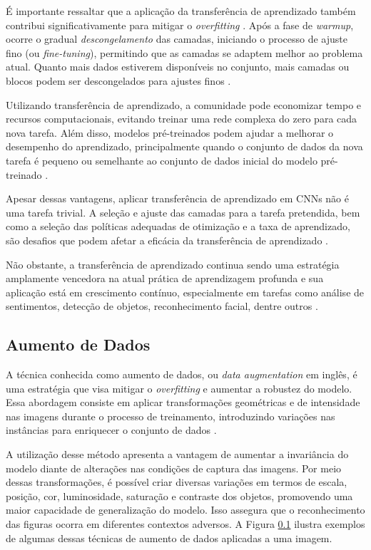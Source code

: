 É importante ressaltar que a aplicação da transferência de aprendizado também contribui significativamente para mitigar o \textit{overfitting} \citep{Geron2017Hands-onSystems}. Após a fase de \textit{warmup}, ocorre o gradual \textit{descongelamento} das camadas, iniciando o processo de ajuste fino (ou \textit{fine-tuning}), permitindo que as camadas se adaptem melhor ao problema atual. Quanto mais dados estiverem disponíveis no conjunto, mais camadas ou blocos podem ser descongelados para ajustes finos \citep{Geron2017Hands-onSystems}.

Utilizando transferência de aprendizado, a comunidade pode economizar tempo e recursos computacionais, evitando treinar uma rede complexa do zero para cada nova tarefa. Além disso, modelos pré-treinados podem ajudar a melhorar o desempenho do aprendizado, principalmente quando o conjunto de dados da nova tarefa é pequeno ou semelhante ao conjunto de dados inicial do modelo pré-treinado \citep{Pan2010}.

Apesar dessas vantagens, aplicar transferência de aprendizado em CNNs não é uma tarefa trivial. A seleção e ajuste das camadas para a tarefa pretendida, bem como a seleção das políticas adequadas de otimização e a taxa de aprendizado, são desafios que podem afetar a eficácia da transferência de aprendizado \citep{Yosinski2014HowNetworks}.

Não obstante, a transferência de aprendizado continua sendo uma estratégia amplamente vencedora na atual prática de aprendizagem profunda e sua aplicação está em crescimento contínuo, especialmente em tarefas como análise de sentimentos, detecção de objetos, reconhecimento facial, dentre outros \citep{Pan2010}.

\subsection{Aumento de Dados}
\label{cnn:augment}

A técnica conhecida como aumento de dados, ou \textit{data augmentation} em inglês, é uma estratégia que visa mitigar o \textit{overfitting} e aumentar a robustez do modelo. Essa abordagem consiste em aplicar transformações geométricas e de intensidade nas imagens durante o processo de treinamento, introduzindo variações nas instâncias para enriquecer o conjunto de dados \citep{Geron2017Hands-onSystems}.

A utilização desse método apresenta a vantagem de aumentar a invariância do modelo diante de alterações nas condições de captura das imagens. Por meio dessas transformações, é possível criar diversas variações em termos de escala, posição, cor, luminosidade, saturação e contraste dos objetos, promovendo uma maior capacidade de generalização do modelo. Isso assegura que o reconhecimento das figuras ocorra em diferentes contextos adversos. A Figura \ref{cnn:augment} ilustra exemplos de algumas dessas técnicas de aumento de dados aplicadas a uma imagem.

